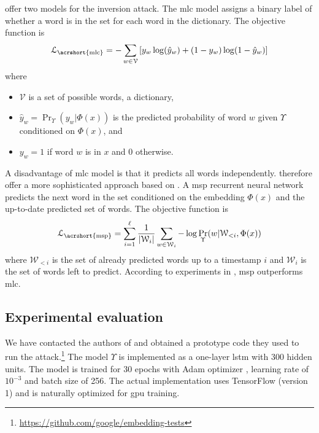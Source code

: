 			\textcite{embedding-attacks} offer two models for the inversion attack.
			The \acrfull{mlc} model assigns a binary label of whether a word is in the set for each word in the dictionary.
			The objective function is
			\[
				\mathcal{L}_{\text{\acrshort{mlc}}} = -\sum_{ w \in \mathcal{V} } \left[ y_w \log( \hat{y}_w ) + (1 - y_w) \log(1 - \hat{y}_w) \right]
			\]
			where
			\begin{itemize}
				\item $\mathcal{V}$ is a set of possible words, a dictionary,
				\item $\hat{y}_w = \Pr_\Upsilon( y_w | \Phi( x ) )$ is the predicted probability of word $w$ given $\Upsilon$ conditioned on $\Phi( x )$, and
				\item $y_w = 1$ if word $w$ is in $x$ and 0 otherwise.
			\end{itemize}

			A disadvantage of \acrshort{mlc} model is that it predicts all words independently.
			\textcite{embedding-attacks} therefore offer a more sophisticated approach based on \cite{msp}.
			A \acrfull{msp} recurrent neural network predicts the next word in the set conditioned on the embedding $\Phi( x )$ and the up-to-date predicted set of words.
			The objective function is
			\[
				\mathcal{L}_{\text{\acrshort{msp}}} = \sum_{ i = 1 }^\ell \frac{1}{| \mathcal{W}_i |} \sum_{w \in \mathcal{W}_i } - \log \Pr_\Upsilon( w | \mathcal{W}_{ < i }, \Phi( x ) )
			\]
			where $\mathcal{W}_{ < i }$ is the set of already predicted words up to a timestamp $i$ and $\mathcal{W}_i$ is the set of words left to predict.
			According to experiments in \cite{embedding-attacks}, \acrshort{msp} outperforms \acrshort{mlc}.

		\subsection{Experimental evaluation}\label{section:knn-snapshot:attacks:experiments}

			We have contacted the authors of \cite{embedding-attacks} and obtained a prototype code they used to run the attack.\footnote{
				\url{https://github.com/google/embedding-tests}
			}
			The model $\Upsilon$ is implemented as a one-layer \acrshort{lstm} with \num{300} hidden units.
			The model is trained for 30 epochs with Adam optimizer \cite{adam-optimizer}, learning rate of $10^{-3}$ and batch size of 256.
			The actual implementation uses TensorFlow \cite{tensorflow} (version 1) and is naturally optimized for \acrshort{gpu} training.

